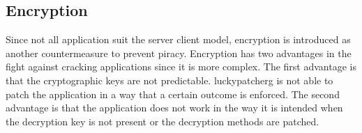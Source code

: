 \subsection{Encryption} \label{subsection:counter-replace-encryption-content}
Since not all application suit the server client model, encryption is introduced as another countermeasure to prevent piracy.
Encryption has two advantages in the fight against cracking applications since it is more complex.
The first advantage is that the cryptographic keys are not predictable.
\gls{luckypatcherg} is not able to patch the application in a way that a certain outcome is enforced.
The second advantage is that the application does not work in the way it is intended when the decryption key is not present or the decryption methods are patched.







